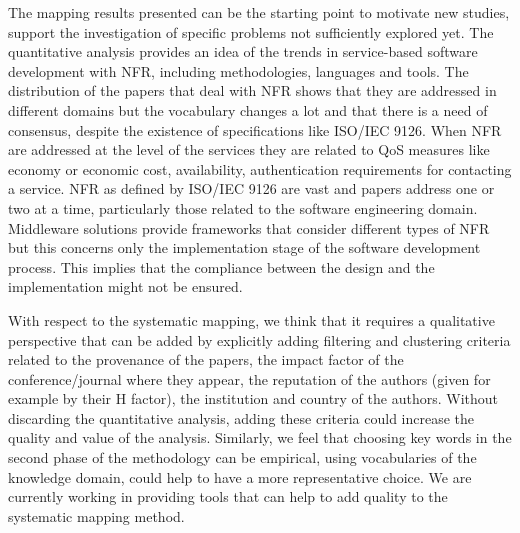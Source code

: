 The mapping results presented can be the starting point
to motivate new studies, support the investigation of specific problems not sufficiently explored yet. The quantitative analysis provides an idea of the trends in service-based software development with NFR, including methodologies, languages and tools. The distribution of the papers that deal with NFR shows that they are addressed in different domains but  the vocabulary changes a lot and that there is a need of consensus, despite the existence of specifications like ISO/IEC 9126. When NFR are addressed at the level of the services they are related to QoS measures like economy or economic cost, availability, authentication requirements for contacting a service. NFR as defined by ISO/IEC 9126 are vast and papers address one or two at a time, particularly those related to the software engineering domain. Middleware solutions provide frameworks that consider different types of NFR but this concerns only the implementation stage of the software development process. This implies that the compliance between the design and the implementation might not be ensured.

With respect to the systematic mapping, we think that it requires a qualitative perspective that can be added by explicitly adding filtering and clustering criteria related to the provenance of the papers, the impact factor of the conference/journal where they appear, the reputation of the authors (given for example by their H factor), the institution and country of the authors. Without discarding the quantitative analysis, adding these criteria could increase the quality and value of the analysis. Similarly, we feel that choosing key words in the second phase of the methodology can be empirical, using vocabularies of the knowledge domain, could help to have a more representative choice. We are currently working in providing tools that can help to add quality to the systematic mapping method.
